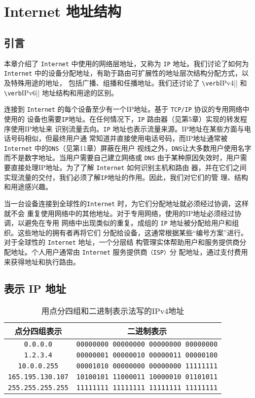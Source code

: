 \chapter{ Internet 地址结构}
\minitoc
\section{引言}
本章介绍了 \verb|Internet| 中使用的网络层地址，又称为 \verb|IP| 地址。我们讨论了如何为 \verb|Internet|
中的设备分配地址，有助于路由可扩展性的地址层次结构分配方式，以及特殊用途的地址，
包括广播、组播和任播地址。我们还讨论了 \verb|\verb|IPv4|| 和 \verb|\verb|IPv6|| 地址结构和用途的区别。

连接到 \verb|Internet| 的每个设备至少有一个IP地址。基于 \verb|TCP/IP| 协议的专用网络中使用的
设备也需要\verb|IP|地址。在任何情况下，\verb|IP| 路由器（见第5章）实现的转发程序使用IP地址来
识别流量去向。\verb|IP| 地址也表示流量来源。IP地址在某些方面与电话号码相似，但最终用户通
常知道并直接使用电话号码，而IP地址通常被 \verb|Internet| 中的\verb|DNS|（见第11章）屏蔽在用户
视线之外，\verb|DNS|让大多数用户使用名字而不是数字地址。当用户需要自己建立网络或 \verb|DNS|
由于某种原因失效时，用户需要直接处理IP地址。为了了解 \verb|Internet| 如何识别主机和路由
器，并在它们之间实现流量的交付，我们必须了解\verb|IP|地址的作用。因此，我们对它们的管
理、结构和用途感兴趣。

当一台设备连接到全球性的\verb|Internet| 时，为它们分配地址就必须经过协调，这样就不会
重复使用网络中的其他地址。对于专用网络，使用的IP地址必须经过协调，以避免在专用
网络中出现类似的重复。成组的 \verb|IP| 地址被分配给用户和组织。这些地址的拥有者再将它们
分配给设备，这通常根据某些“编号方案”进行。对于全球性的 \verb|Internet| 地址，一个分层结
构管理实体帮助用户和服务提供商分配地址。个人用户通常由 \verb|Internet| 服务提供商\verb|（ISP）|分
配地址，通过支付费用来获得地址和执行路由。

\section{表示 IP 地址}

\begin{table}[H]
    \centering
    \label{tab:2.1}
    \caption{用点分四组和二进制表示法写的IPv4地址}
    \begin{tabular}{|c|c|}
        \hline
        点分四组表示             &                    二进制表示                \\ \hline
        \verb|0.0.0.0|         & \verb|00000000 00000000 00000000 00000000| \\ \hline
        \verb|1.2.3.4|         & \verb|00000001 00000010 00000011 00000100| \\ \hline
        \verb|10.0.0.255|      & \verb|00001010 00000000 00000000 11111111| \\ \hline
        \verb|165.195.130.107| & \verb|10100101 11000011 10000010 01101011| \\ \hline
        \verb|255.255.255.255| & \verb|11111111 11111111 11111111 11111111| \\ \hline
    \end{tabular}
\end{table}


